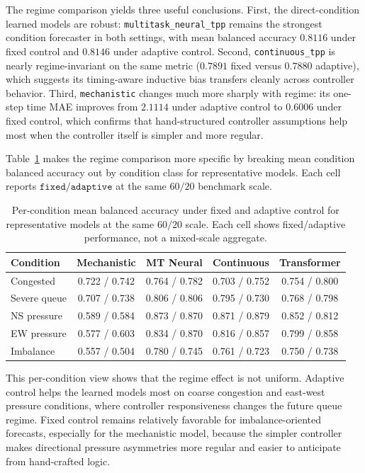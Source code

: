 \documentclass[11pt]{article}
\begin{document}
The regime comparison yields three useful conclusions. First, the direct-condition learned models are robust: \texttt{multitask\_neural\_tpp} remains the strongest condition forecaster in both settings, with mean balanced accuracy \(0.8116\) under fixed control and \(0.8146\) under adaptive control. Second, \texttt{continuous\_tpp} is nearly regime-invariant on the same metric (\(0.7891\) fixed versus \(0.7880\) adaptive), which suggests its timing-aware inductive bias transfers cleanly across controller behavior. Third, \texttt{mechanistic} changes much more sharply with regime: its one-step time MAE improves from \(2.1114\) under adaptive control to \(0.6006\) under fixed control, which confirms that hand-structured controller assumptions help most when the controller itself is simpler and more regular.

Table~\ref{tab:per-condition-regime} makes the regime comparison more specific by breaking mean condition balanced accuracy out by condition class for representative models. Each cell reports \(\texttt{fixed} / \texttt{adaptive}\) at the same \(60/20\) benchmark scale.

\begin{table}[H]
\centering
\small
\begin{tabular}{lcccc}
\toprule
Condition & Mechanistic & MT Neural & Continuous & Transformer \\
\midrule
Congested & 0.722 / 0.742 & 0.764 / 0.782 & 0.703 / 0.752 & 0.754 / 0.800 \\
Severe queue & 0.707 / 0.738 & 0.806 / 0.806 & 0.795 / 0.730 & 0.768 / 0.798 \\
NS pressure & 0.589 / 0.584 & 0.873 / 0.870 & 0.871 / 0.879 & 0.852 / 0.812 \\
EW pressure & 0.577 / 0.603 & 0.834 / 0.870 & 0.816 / 0.857 & 0.799 / 0.858 \\
Imbalance & 0.557 / 0.504 & 0.780 / 0.745 & 0.761 / 0.723 & 0.750 / 0.738 \\
\bottomrule
\end{tabular}
\caption{Per-condition mean balanced accuracy under fixed and adaptive control for representative models at the same \(60/20\) scale. Each cell shows fixed/adaptive performance, not a mixed-scale aggregate.}
\label{tab:per-condition-regime}
\end{table}

This per-condition view shows that the regime effect is not uniform. Adaptive control helps the learned models most on coarse congestion and east-west pressure conditions, where controller responsiveness changes the future queue regime. Fixed control remains relatively favorable for imbalance-oriented forecasts, especially for the mechanistic model, because the simpler controller makes directional pressure asymmetries more regular and easier to anticipate from hand-crafted logic.
\end{document}
